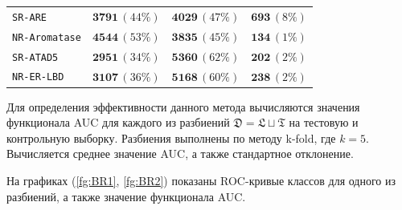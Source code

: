 \documentclass[12pt,twoside]{article}
\begin{document}
\begin{table}[H]
\begin{tabular}{lrrr}
{\tt SR-ARE}
& $\mathbf{3791}\, (44 \%)$
& $\mathbf{4029}\, (47 \%)$
& $\mathbf{693}\, (8 \%)$\\

{\tt NR-Aromatase}
& $\mathbf{4544}\, (53 \%)$
& $\mathbf{3835}\, (45 \%)$
& $\mathbf{134}\, (1 \%)$\\

{\tt SR-ATAD5}
& $\mathbf{2951}\, (34 \%)$
& $\mathbf{5360}\, (62 \%)$
& $\mathbf{202}\, (2 \%)$\\

{\tt NR-ER-LBD}
& $\mathbf{3107}\, (36 \%)$
& $\mathbf{5168}\, (60 \%)$
& $\mathbf{238}\, (2 \%)$\\
		\hline
	\end{tabular}
\end{table}

Для определения эффективности данного метода вычисляются значения функционала AUC для каждого из разбиений $\mathfrak{D}=\mathfrak{L}\sqcup\mathfrak{T}$ на тестовую и контрольную выборку. Разбиения выполнены по методу k-fold, где $k=5$. Вычисляется среднее значение AUC, а также стандартное отклонение.

На графиках (\ref{fg:BR1}, \ref{fg:BR2}) показаны ROC-кривые классов для одного из разбиений, а также значение функционала AUC.

\end{document}
